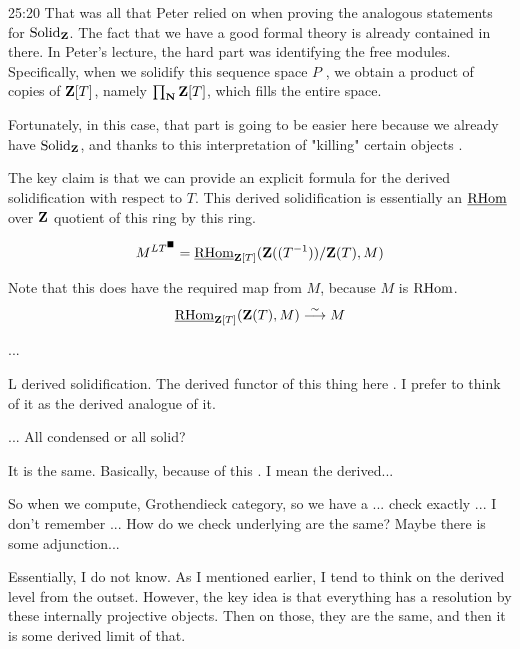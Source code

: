 \begin{unfinished}{25:20}
That was all that Peter relied on when proving the analogous statements for $\mathrm{Solid}_\mathbf Z$.
The fact that we have a good formal theory is already contained in there. In Peter's lecture, the hard part was identifying the free modules. Specifically, when we solidify this sequence space $P$ , we obtain a product of copies of $\mathbf Z[T]$, namely $\prod_\mathbf N \mathbf Z[T]$, which fills the entire space.

Fortunately, in this case, that part is going to be easier here because we already have $\mathrm{Solid}_\mathbf Z$, and thanks to this interpretation of "killing" certain objects . 

The key claim is that we can provide an explicit formula for the derived solidification with respect to $T$. This derived solidification is essentially an $\operatorname{\underline{RHom}}$ over $\mathbf Z$ quotient of this ring by this ring.

\begin{align*}
M^{LT^\blacksquare} = \operatorname{\underline{RHom}}_{\mathbf Z[T]}(\mathbf Z((T^{-1}))/\mathbf Z(T), M)
\end{align*}
\ecl

Note that this does have the required map from $M$, because $M$ is $\operatorname{RHom}$. 
\begin{align*}
\operatorname{\underline{RHom}}_{\mathbf Z[T]}(\mathbf Z(T), M) \overset\sim\longrightarrow M
\end{align*}

\ques ...

\ans L derived solidification. The derived functor of this thing here . I prefer to think of it as the derived analogue of it. 

\ques ... All condensed or all solid?

\ans It is the same. Basically, because of this . I mean the derived...

\ques So when we compute, Grothendieck category, so we have a ... check exactly ... I don't remember ... How do we check underlying are the same? Maybe there is some adjunction... 


\ans Essentially, I do not know. As I mentioned earlier, I tend to think on the derived level from the outset. However, the key idea is that everything has a resolution by these internally projective objects. Then on those, they are the same, and then it is some derived limit of that.


\end{unfinished}
